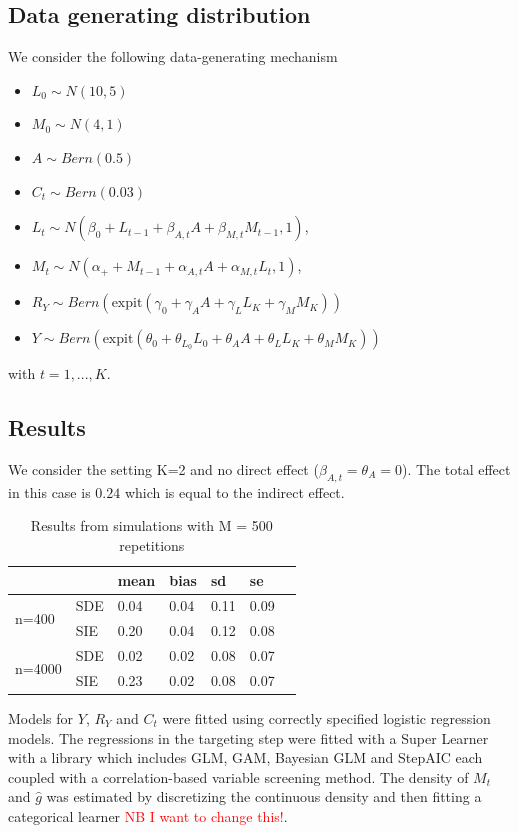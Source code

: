 \documentclass[AMA,STIX1COL]{WileyNJD-v2}
\newcommand{\red}[1]{\textcolor{red}{#1}}
\begin{document}
\subsection{Data generating distribution}
We consider the following data-generating mechanism

\begin{itemize}
  \item[] $L_0 \sim N(10, 5)$
  \item[] $M_0 \sim N(4, 1)$
  \item[] $A \sim Bern(0.5)$
  \item[] $C_t \sim Bern\left(0.03\right)$
  \item[] $L_t \sim N(\beta_0 + L_{t-1} + \beta_{A,t} A + \beta_{M,t} M_{t-1}, 1)$, 
  \item[] $M_t \sim N(\alpha_+ + M_{t-1}+ \alpha_{A, t} A + \alpha_{M,t} L_t, 1)$, 
  \item[] $R_Y \sim Bern\left(\text{expit}(\gamma_0 + \gamma_A A + \gamma_L L_K + \gamma_M M_K)\right)$
  \item[] $Y \sim Bern\left(\text{expit}(\theta_0 + \theta_{L_0} L_0+\theta_A A + \theta_L L_K +\theta_M M_K)\right)$
\end{itemize}
with $t=1,...,K$.

\subsection{Results}

We consider the setting K=2 and no direct effect ($\beta_{A,t}= \theta_A=0$). The total effect in this case is $0.24$ which is equal to the indirect effect. 

\begin{table}[h!]
\centering
\begin{tabular}{lllllll}
\hline
                        &     & mean & bias & sd & se  \\ \hline
\multirow{2}{*}{n=400}  & SDE & 0.04     & 0.04     & 0.11   & 0.09        \\
                        & SIE &  0.20    & 0.04     & 0.12   & 0.08        \\
\multirow{2}{*}{n=4000} & SDE &  0.02    & 0.02     & 0.08   & 0.07         \\
                        & SIE &  0.23    & 0.02      & 0.08   & 0.07       
\end{tabular}
\label{tab:simres}
\caption{Results from simulations with M = 500 repetitions}
\end{table}
Models for $Y$, $R_Y$ and $C_t$ were fitted using correctly specified logistic regression models. The regressions in the targeting step were fitted with a Super Learner with a library which includes GLM, GAM, Bayesian GLM and StepAIC each coupled with a correlation-based variable screening method. The density of $M_t$ and $\hat{g}$ was estimated by discretizing the continuous density and then fitting a categorical learner \red{NB I want to change this!}.
\end{document}
